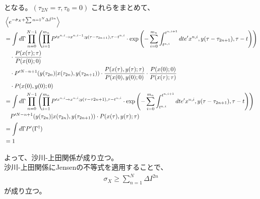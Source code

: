 \documentclass[a4paper,11pt]{jsarticle}
\numberwithin{equation}{section}
\begin{document}
となる。$(\tau_{2N} = \tau,\tau_0 = 0)$
これらをまとめて、
\begin{align}
    &\left\langle e^{-\hat{\sigma}_X + \sum{n=1}^N \Delta \hat{I}^{2n}} \right\rangle \\
    &= \int d\Gamma \prod_{n=0}^{N-1} \left( \prod_{i=1}^{m_n} P'^{x^{n,i} \to x^{n,i-1}; y(\tau-\tau_{2n+1}), \tau - t^{n,i}} \cdot \exp \left( -\sum_{i=0}^{m_n} \int_{t^{n,i}}^{t^{n,i+1}} dt e'{x^{n,i}, y(\tau-\tau_{2n+1}), \tau - t} \right) \right) \notag \\
    &\quad \cdot \frac{P(x(\tau); \tau)}{P(x(0); 0)} \\
    &\quad \cdot P'^{N-n+1}(y(\tau_{2n}) | x(\tau_{2n}), y(\tau_{2n+1})) \cdot \frac{P(x(\tau),y(\tau); \tau)}{P(x(0), y(0); 0)} \cdot \frac{P(x(0); 0)}{P(x(\tau); \tau)} \\
    &\quad \cdot P(x(0),y(0); 0)\\
    &= \int d\Gamma \prod_{n=0}^{N-1} \left( \prod_{i=1}^{m_n} P'^{x^{n,i} \to x^{n,i}; y(\tau-\tau{2n+1}), \tau - t^{n,i}} \cdot \exp \left( -\sum_{i=0}^{m_n} \int_{t^{n,i}}^{t^{n,i+1}} dt e'{x^{n,i}, y(\tau-\tau_{2n+1}), \tau - t} \right) \right) \notag \\
    &\quad P'^{N-n+1}(y(\tau_{2n}) | x(\tau_{2n}), y(\tau_{2n+1})) \cdot P(x(\tau),y(\tau); \tau)\\
    &= \int d\Gamma P'(\Gamma^{\dagger}) \\
    &= 1
    \end{align}

よって、沙川-上田関係が成り立つ。\hfill\qedsymbol\\

沙川-上田関係にJensenの不等式を適用することで、
\begin{align}
    \sigma_X \geq \sum_{n=1}^N \Delta I^{2n}
\end{align}
が成り立つ。
\end{document}
